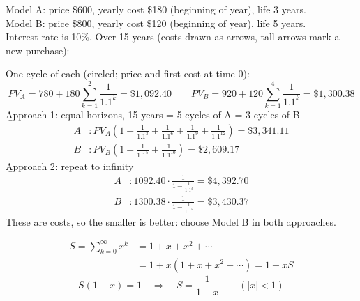 \begin{example}
    Model A: price \$600, yearly cost \$180 (beginning of year), life 3 years.
    \\Model B: price \$800, yearly cost \$120 (beginning of year), life 5 years.
    \\Interest rate is 10\%. Over 15 years (costs drawn as arrows, tall arrows mark a new purchase):
    \begin{center}
    \end{center}
    One cycle of each (circled; price and first cost at time 0):
    \[PV_A = 780 + 180\sum_{k=1}^{2}\frac{1}{1.1^k} = \$1,092.40 \qquad PV_B = 920 + 120\sum_{k=1}^{4}\frac{1}{1.1^k} = \$1,300.38\]
    \b{Approach 1}: equal horizons, 15 years = 5 cycles of A = 3 cycles of B
    \begin{align*}
        A&: PV_A\left(1+\frac{1}{1.1^3}+\frac{1}{1.1^6}+\frac{1}{1.1^9}+\frac{1}{1.1^{12}}\right) = \$3,341.11\\
        B&: PV_B\left(1+\frac{1}{1.1^5}+\frac{1}{1.1^{10}}\right) = \$2,609.17
    \end{align*}
    \b{Approach 2}: repeat to infinity
    \begin{align*}
        A&: 1092.40\cdot\frac{1}{1-\frac{1}{1.1^3}} = \$4,392.70\\
        B&: 1300.38\cdot\frac{1}{1-\frac{1}{1.1^5}} = \$3,430.37
    \end{align*}
    These are costs, so the smaller is better: choose Model B in both approaches.
\end{example}

\begin{align*}
    S = \sum_{k=0}^{\infty}x^k &= 1 + x + x^2 + \cdots\\
    &= 1 + x(1+x+x^2+\cdots) = 1 + xS
\end{align*}
\[S(1-x) = 1 \quad \Rightarrow \quad S = \frac{1}{1-x} \qquad (|x|<1)\]
